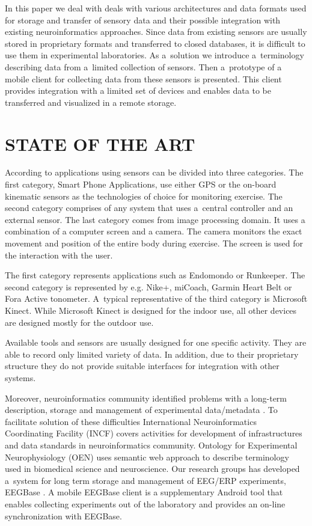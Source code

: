 \documentclass[a4paper,twoside]{article}
\begin{document}
In this paper we deal with deals with various architectures and data formats used for storage and transfer of sensory data and their possible integration with existing neuroinformatics approaches. Since data from existing sensors are usually stored in proprietary formats and transferred to closed databases, it is difficult to use them in experimental laboratories. As a~solution we introduce a~terminology describing data from a~limited collection of sensors. Then a~prototype of a mobile client for collecting data from these sensors is presented. This client provides integration with a limited set of devices and enables data to be transferred and visualized in a remote storage.

\section{\uppercase{state of the art}}
\label{sec:state-of-the-art}

\noindent
According to \cite{Lowe2012242} applications using sensors can be divided into three categories. The first category, Smart Phone Applications, use either GPS or the
on-board kinematic sensors as the technologies of choice for monitoring exercise. The second category comprises of any system that uses a~central controller
and an external sensor. The last category comes from image processing domain. It uses a combination of a computer screen and a camera. The camera monitors the exact movement and position of the entire body during exercise. The screen is used for the interaction with the user.

The first category represents applications such as Endomondo or Runkeeper. The second category is represented by e.g. Nike+, miCoach, Garmin Heart Belt or Fora Active tonometer. A~typical representative of the third category is Microsoft Kinect. While Microsoft Kinect is designed for the indoor use, all other devices are designed mostly for the outdoor use.

Available tools and sensors are usually designed for one specific activity. They are able to record only limited variety of data. In addition, due to their proprietary structure they do not provide suitable interfaces for integration with other systems.

Moreover, neuroinformatics community identified problems with a long-term description, storage and management of experimental data/metadata \cite{CRCNS}. To facilitate solution of these difficulties International Neuroinformatics Coordinating Facility (INCF) \cite{INCF} covers activities for development of infrastructures and data standards in neuroinformatics community. Ontology for Experimental Neurophysiology (OEN) \cite{10.3389/conf.fninf.2014.18.00044} uses semantic web approach to describe terminology used in biomedical science and neuroscience.  Our research groups has developed a~system for long term storage and management of EEG/ERP experiments, EEGBase \cite{ISI:000306821100004}. A mobile EEGBase client \cite{10.3389/conf.fninf.2013.09.00046} is a supplementary Android tool that enables collecting experiments out of the laboratory and provides an on-line synchronization with EEGBase.
\end{document}
